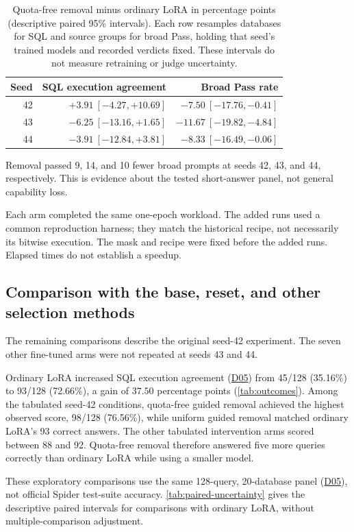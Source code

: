 \documentclass[10pt,letterpaper]{article}
\DeclareRobustCommand{\dataset}[1]{\hyperlink{dataset-#1}{\textnormal{#1}}}
\begin{document}
\begin{table}[!htbp]
\centering
\small
\caption{Quota-free removal minus ordinary LoRA in percentage points
(descriptive paired 95\% intervals). Each row resamples databases for SQL
and source groups for broad Pass, holding that seed's trained models and
recorded verdicts fixed. These intervals do not measure retraining or judge
uncertainty.}
\label{tab:seed-contrasts}
\begin{tabular}{@{}rrr@{}}
\toprule
Seed & SQL execution agreement & Broad Pass rate\\
\midrule
42 & $+3.91\ [-4.27,+10.69]$ & $-7.50\ [-17.76,-0.41]$\\
43 & $-6.25\ [-13.16,+1.65]$ & $-11.67\ [-19.82,-4.84]$\\
44 & $-3.91\ [-12.84,+3.81]$ & $-8.33\ [-16.49,-0.06]$\\
\bottomrule
\end{tabular}
\end{table}

Removal passed 9, 14, and 10 fewer broad prompts at seeds 42, 43, and 44,
respectively. This is evidence about the tested short-answer panel, not
general capability loss.

Each arm completed the same one-epoch workload. The added runs used a
common reproduction harness; they match the historical recipe, not
necessarily its bitwise execution. The mask and recipe were fixed before
the added runs. Elapsed times do not establish a speedup.

\subsection{Comparison with the base, reset, and other selection methods}

The remaining comparisons describe the original seed-42 experiment. The
seven other fine-tuned arms were not repeated at seeds 43 and 44.

Ordinary LoRA increased SQL execution agreement (\dataset{D05}) from 45/128 (35.16\%)
to 93/128 (72.66\%), a gain of $37.50$ percentage points
(\autoref{tab:outcomes}).
Among the tabulated seed-42 conditions, quota-free guided removal achieved the highest observed score,
98/128 (76.56\%), while uniform guided removal matched ordinary LoRA's
93 correct answers. The other tabulated intervention arms scored between 88 and 92.
Quota-free removal therefore answered five more queries correctly than
ordinary LoRA while using a smaller model.

These exploratory comparisons use the same 128-query, 20-database panel
(\dataset{D05}), not official Spider test-suite accuracy.
\autoref{tab:paired-uncertainty} gives the descriptive paired intervals
for comparisons with ordinary LoRA, without multiple-comparison adjustment.
\end{document}
